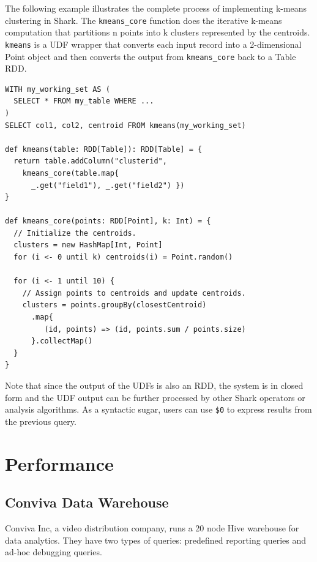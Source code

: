 \documentclass[preprint]{acm_proc_article-sp}
\begin{document}
The following example illustrates the complete process of implementing k-means clustering in Shark. The \texttt{kmeans\_core} function does the iterative k-means computation that partitions n points into k clusters represented by the centroids. \texttt{kmeans} is a UDF wrapper that converts each input record into a 2-dimensional Point object and then converts the output from \texttt{kmeans\_core} back to a Table RDD. 
{\small
\begin{verbatim}
WITH my_working_set AS (
  SELECT * FROM my_table WHERE ...
)
SELECT col1, col2, centroid FROM kmeans(my_working_set)

def kmeans(table: RDD[Table]): RDD[Table] = {
  return table.addColumn("clusterid",
    kmeans_core(table.map{
      _.get("field1"), _.get("field2") })
}

def kmeans_core(points: RDD[Point], k: Int) = {
  // Initialize the centroids.
  clusters = new HashMap[Int, Point]
  for (i <- 0 until k) centroids(i) = Point.random()

  for (i <- 1 until 10) {
    // Assign points to centroids and update centroids.
    clusters = points.groupBy(closestCentroid)
      .map{ 
         (id, points) => (id, points.sum / points.size)
      }.collectMap()
  }
}
\end{verbatim}
}

Note that since the output of the UDFs is also an RDD, the system is in closed form and the UDF output can be further processed by other Shark operators or analysis algorithms. As a syntactic sugar, users can use \texttt{\$0} to express results from the previous query.

\section{Performance}

\subsection{Conviva Data Warehouse}

Conviva Inc, a video distribution company, runs a 20 node Hive warehouse for data analytics. They have two types of queries: predefined reporting queries and ad-hoc debugging queries. 
\end{document}
